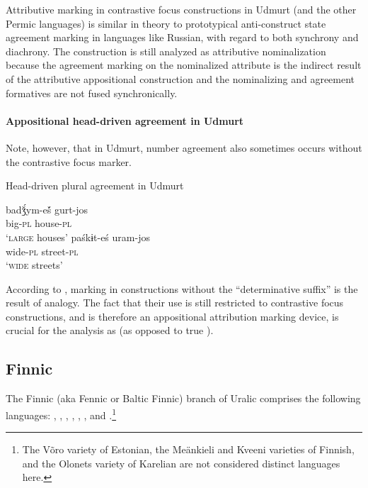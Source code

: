 Attributive marking in contrastive focus constructions in Udmurt (and the other Permic languages) is similar in theory to prototypical anti\hyp{}construct state agreement marking in languages like Russian, with regard to both synchrony and diachrony. The construction is still analyzed as attributive nominalization because the agreement marking on the nominalized attribute is the indirect result of the attributive appositional construction and the nominalizing and agreement formatives are not fused synchronically.

\paragraph*{Appositional head\hyp{}driven agreement in Udmurt}
Note, however, that in Udmurt, number agreement also sometimes occurs without the contrastive focus marker.
\begin{exe}
\ex \rm{Head\hyp{}driven plural agreement in Udmurt}
\begin{xlist}
\ex 
\gll	badǯ́ym-eš́ gurt-jos\\
	big-\textsc{pl} house-\textsc{pl}\\
\glt	‘\textsc{large} houses’ \citep[40]{winkler2001}
\ex 
\gll	paśkɨt-eś uram-jos\\
	wide-\textsc{pl} street-\textsc{pl}\\
\glt	‘\textsc{wide} streets’ \citep[63]{csucs1990}
\end{xlist}
\end{exe}
According to \citet[63]{csucs1990},  marking in constructions without the “determinative suffix” is the result of analogy. The fact that their use is still restricted to contrastive focus constructions, and is therefore an appositional attribution marking device, is crucial for the analysis as  (as opposed to true ).

\subsection{Finnic}
The Finnic (aka Fennic or Baltic Finnic) branch of Uralic comprises the following languages: , , , , , ,  and .\footnote{The Võro variety of Estonian, the Meänkieli and Kveeni varieties of Finnish, and the Olonets variety of Karelian are not considered distinct languages here.}

